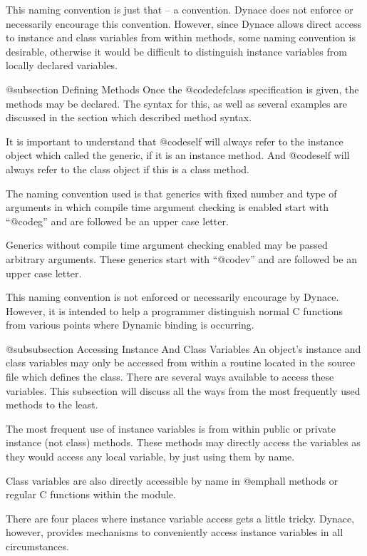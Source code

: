 This naming convention is just that -- a convention.  Dynace does
not enforce or necessarily encourage this convention.  However,
since Dynace allows direct access to instance and class variables
from within methods, some naming convention is desirable, otherwise
it would be difficult to distinguish instance variables from locally
declared variables.

@subsection Defining Methods
Once the @code{defclass} specification is given, the methods may be
declared.  The syntax for this, as well as several examples are discussed
in the section which described method syntax.

It is important to understand that @code{self} will always refer to the
instance object which called the generic, if it is an instance method.
And @code{self} will always refer to the class object if this is a
class method.

The naming convention used is that generics with fixed number and
type of arguments in which compile time argument checking is enabled
start with ``@code{g}'' and are followed be an upper case letter.

Generics without compile time argument checking enabled may be passed
arbitrary arguments.  These generics start with ``@code{v}'' and are
followed be an upper case letter.

This naming convention is not enforced or necessarily encourage by
Dynace.  However, it is intended to help a programmer distinguish normal
C functions from various points where Dynamic binding is occurring.


@subsubsection Accessing Instance And Class Variables
An object's instance and class variables may only be accessed from
within a routine located in the source file which defines the class.
There are several ways available to access these variables.  This
subsection will discuss all the ways from the most frequently used
methods to the least.

The most frequent use of instance variables is from within public or
private instance (not class) methods.  These methods may directly access
the variables as they would access any local variable, by just using
them by name.

Class variables are also directly accessible by name in @emph{all}
methods or regular C functions within the module.

There are four places where instance variable access gets a little tricky.
Dynace, however, provides mechanisms to conveniently access instance
variables in all circumstances.


